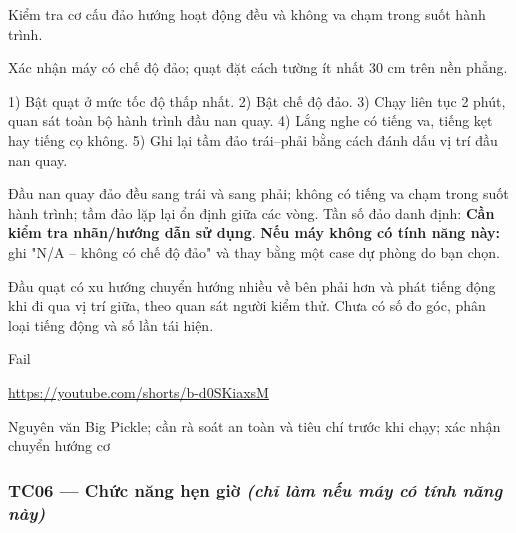 \begin{description}
\tightlist
\item[Objective]
Kiểm tra cơ cấu đảo hướng hoạt động đều và không va chạm trong suốt hành trình.
\item[Input]
Xác nhận máy có chế độ đảo; quạt đặt cách tường ít nhất 30 cm trên nền phẳng.
\item[Steps]
1) Bật quạt ở mức tốc độ thấp nhất. 2) Bật chế độ đảo. 3) Chạy liên tục 2 phút, quan sát toàn bộ hành trình đầu nan quay. 4) Lắng nghe có tiếng va, tiếng kẹt hay tiếng cọ không. 5) Ghi lại tầm đảo trái--phải bằng cách đánh dấu vị trí đầu nan quay.
\item[Expected]
Đầu nan quay đảo đều sang trái và sang phải; không có tiếng va chạm trong suốt hành trình; tầm đảo lặp lại ổn định giữa các vòng. Tần số đảo danh định: \textbf{Cần kiểm tra nhãn/hướng dẫn sử dụng}. \textbf{Nếu máy không có tính năng này:} ghi "N/A -- không có chế độ đảo" và thay bằng một case dự phòng do bạn chọn.
\item[Actual]
Đầu quạt có xu hướng chuyển hướng nhiều về bên phải hơn và phát tiếng động khi đi qua vị trí giữa, theo quan sát người kiểm thử. Chưa có số đo góc, phân loại tiếng động và số lần tái hiện.
\item[Verdict]
Fail
\item[Bằng chứng]
\url{https://youtube.com/shorts/b-d0SKiaxsM}
\item[Ghi chú rà soát]
Nguyên văn Big Pickle; cần rà soát an toàn và tiêu chí trước khi chạy; xác nhận chuyển hướng cơ
\end{description}

\subsubsection{\texorpdfstring{TC06 --- Chức năng hẹn giờ \emph{(chỉ làm nếu máy có tính năng này)}}{TC06 --- Chức năng hẹn giờ (chỉ làm nếu máy có tính năng này)}}\label{tc06-chux1ee9c-nux103ng-hux1eb9n-giux1edd-chux1ec9-luxe0m-nux1ebfu-muxe1y-cuxf3-tuxednh-nux103ng-nuxe0y}

